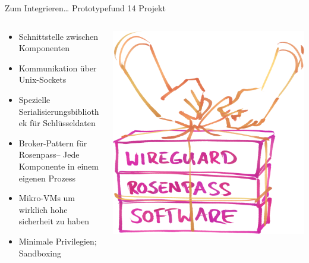 \documentclass[german]{rosenpass-beamer}
\begin{document}
\begin{frame}{Zum Integrieren… Prototypefund 14 Projekt}
\begin{columns}[c]
\begin{column}{0.7\textwidth}
  \begin{itemize}
    \item Schnittstelle zwischen Komponenten
    \item Kommunikation über Unix-Sockets
    \item Spezielle Serialisierungsbibliothek für Schlüsseldaten\footnotemark
    \item Broker-Pattern für Rosenpass– Jede Komponente in einem eigenen Prozess
    \item Mikro-VMs um wirklich hohe sicherheit zu haben
    \item Minimale Privilegien; Sandboxing
  \end{itemize}
\end{column}

\begin{column}{0.2\textwidth}
\includegraphics[width=\linewidth]{graphics/rosenpass in anderen apps.png}


\end{column}
\end{columns}
\end{frame}
\end{document}

